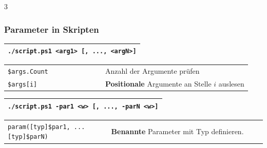 \documentclass[
11pt,
footheight=40pt
]{scrartcl}
\newif\ifexcitingstuff \excitingstufftrue
\begin{document}
\begin{paracol}{3}
	\subsubsection*{Parameter in Skripten}
		\begin{tabular}{|p{1.05\linewidth }|}
	\hline
	    \texttt{./script.ps1 <arg1> [, ..., <argN>]} \\ \hline
	\end{tabular} 
	
	\begin{tabular}{p{0.4\linewidth} p{0.6\linewidth}}
	    \rowcolor{lightyellow} \texttt{\$args.Count} & Anzahl der Argumente prüfen \\
	    \rowcolor{lightyellow} \texttt{\$args[i]} & \textbf{Positionale} Argumente an Stelle $i$ auslesen \\
	\end{tabular}
	
		\begin{tabular}{|p{1.05\linewidth }|}
	\hline
	    \texttt{./script.ps1 -par1 <w> [, ..., -parN <w>]} \\ \hline
	\end{tabular} 
	
	\begin{tabular}{p{0.4\linewidth} p{0.6\linewidth}}
	    \rowcolor{lightyellow} \texttt{param([typ]\$par1, ... [typ]\$parN)} & \textbf{Benannte} Parameter mit Typ definieren. \\
	\end{tabular}
	\fi
	
	\ifexcitingstuff 

\end{paracol}
\end{document}
